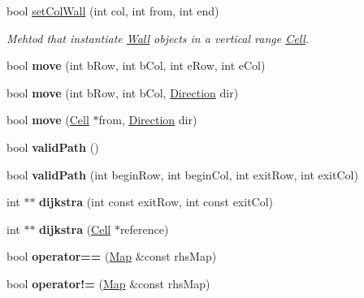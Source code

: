 \begin{DoxyCompactItemize}
bool \hyperlink{class_map_a7e89d11a89a796ac46e60722533f23d4}{set\+Col\+Wall} (int col, int from, int end)
\begin{DoxyCompactList}\small\item\em Mehtod that instantiate \hyperlink{class_wall}{Wall} objects in a vertical range \hyperlink{class_cell}{Cell}. \end{DoxyCompactList}\item 
\hypertarget{class_map_a9c37a12b6aa0fcf4f849a706c4cd2598}{}\label{class_map_a9c37a12b6aa0fcf4f849a706c4cd2598} 
bool {\bfseries move} (int b\+Row, int b\+Col, int e\+Row, int e\+Col)
\item 
\hypertarget{class_map_af9b2cb5b80f93e05fe94d24f0cd0b4d0}{}\label{class_map_af9b2cb5b80f93e05fe94d24f0cd0b4d0} 
bool {\bfseries move} (int b\+Row, int b\+Col, \hyperlink{class_direction}{Direction} dir)
\item 
\hypertarget{class_map_a22641b39f3eadb59771d2e5d02ff19c3}{}\label{class_map_a22641b39f3eadb59771d2e5d02ff19c3} 
bool {\bfseries move} (\hyperlink{class_cell}{Cell} $\ast$from, \hyperlink{class_direction}{Direction} dir)
\item 
\hypertarget{class_map_ad1af1c1145fbc4675952fa10c0aacf61}{}\label{class_map_ad1af1c1145fbc4675952fa10c0aacf61} 
bool {\bfseries valid\+Path} ()
\item 
\hypertarget{class_map_a6749a0b9a270aef552af6bd94f88e7bc}{}\label{class_map_a6749a0b9a270aef552af6bd94f88e7bc} 
bool {\bfseries valid\+Path} (int begin\+Row, int begin\+Col, int exit\+Row, int exit\+Col)
\item 
\hypertarget{class_map_aeb226f399e3e44cc5ecb100b4c378848}{}\label{class_map_aeb226f399e3e44cc5ecb100b4c378848} 
int $\ast$$\ast$ {\bfseries dijkstra} (int const exit\+Row, int const exit\+Col)
\item 
\hypertarget{class_map_aa9ac575aa037a6d8ed05eb4c36bb66c1}{}\label{class_map_aa9ac575aa037a6d8ed05eb4c36bb66c1} 
int $\ast$$\ast$ {\bfseries dijkstra} (\hyperlink{class_cell}{Cell} $\ast$reference)
\item 
\hypertarget{class_map_a76ba15e9f73cfdf657e00720744b4466}{}\label{class_map_a76ba15e9f73cfdf657e00720744b4466} 
bool {\bfseries operator==} (\hyperlink{class_map}{Map} \&const rhs\+Map)
\item 
\hypertarget{class_map_a13a2dfbee73ab704f06d9a6cf153beb6}{}\label{class_map_a13a2dfbee73ab704f06d9a6cf153beb6} 
bool {\bfseries operator!=} (\hyperlink{class_map}{Map} \&const rhs\+Map)
\item 
\hypertarget{class_map_af7b0ff0228286f88cd6b6a2b87604004}{}\label{class_map_af7b0ff0228286f88cd6b6a2b87604004} 

\end{DoxyCompactItemize}
